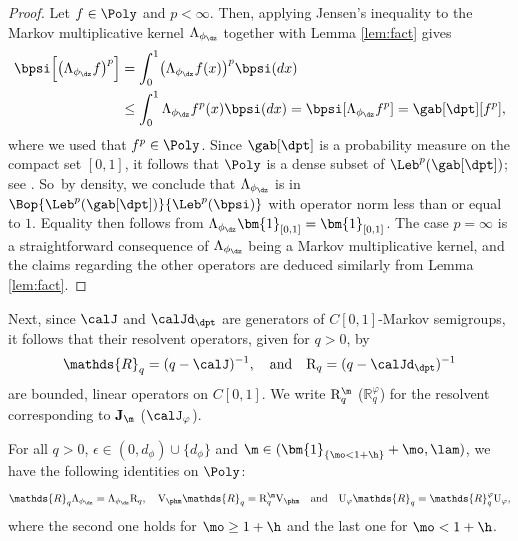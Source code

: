 \begin{proof}
Let $f \in \Poly$ and $p < \infty$. Then, applying Jensen's inequality to the Markov multiplicative kernel $\Lambda_{\phi_{\dz}}$ together with Lemma \ref{lem:fact} gives
\begin{align*}
\bpsi \Bigl[ \bigl(\Lambda_{\phi_{\dz}} f\bigr)^p\Bigr] &= \int_0^1 \bigl(\Lambda_{\phi_{\dz}} f(x) \bigr)^p \bpsi(dx)\\
&\leq \int_0^1 \Lambda_{\phi_{\dz}} f^p(x) \bpsi(dx) = \bpsi[\Lambda_{\phi_{\dz}} f^p] = \gab[\dpt] [ f^p],
\end{align*}
where we used that $f^p \in \Poly$. Since $\gab[\dpt]$ is a probability measure on the compact set $[0,1]$, it follows that $\Poly$ is a dense subset of $\Leb^p(\gab[\dpt])$; see \eg \cite[Cor.\,22.10]{Driver03}. So~by density, we conclude that $\Lambda_{\phi_{\dz}}$ is in $\Bop{\Leb^p(\gab[\dpt])}{\Leb^p(\bpsi)}$ with operator norm less than or equal to $1$. Equality then follows from $\Lambda_{\phi_{\dz}} \bm{1}_{[0,1]} = \bm{1}_{[0,1]}$. The case $p = \infty$ is a straightforward consequence of $\Lambda_{\phi_{\dz}}$ being a Markov multiplicative kernel, and the claims regarding the other operators are deduced similarly from Lemma \ref{lem:fact}.
\end{proof}

Next, since $\calJ$ and $\calJd_{\dpt}$ are generators of $C[0,1]$-Markov semigroups, it follows that their resolvent operators, given for $q > 0$, by
\begin{equation*}
\mathds{R}_q = (q-\calJ)^{-1}, \quad \text{and} \quad {\mathrm{R}}_q = (q-\calJd_{\dpt})^{-1}
\end{equation*}
are bounded, linear operators on $C[0,1]$. We write ${\mathrm{R}}_q^\m$ (\resp $\mathds{R}_q^\varphi$) for the resolvent corresponding to $\mathbf{J}_\m$ (\resp $\calJ_\varphi$).

\begin{lemma}
\label{prop:resolvent-intertwining}
For all $q > 0$, $\epsilon \in (0,d_\phi) \cup \{d_\phi\}$ and $\m \in (\bm{1}_{\{\mo < 1+\h\}}+\mo,\lam)$,
we have the following identities on $\Poly$:
\begin{equation*}
\mathds{R}_q \Lambda_{\phi_{\dz}} = \Lambda_{\phi_{\dz}} \mathrm{R}_q, \quad \mathrm{V}_{\phm} \mathds{R}_q = \mathrm{R}_q^\m \mathrm{V}_{\phm} \quad \text{and} \quad {\mathrm{U}_\varphi} \mathds{R}_q = \mathds{R}_q^\varphi {\mathrm{U}}_\varphi,
\end{equation*}
where the second one holds for $\mo \ge 1 +\h$ and the last one for $\mo < 1 + \h$.
\end{lemma}

